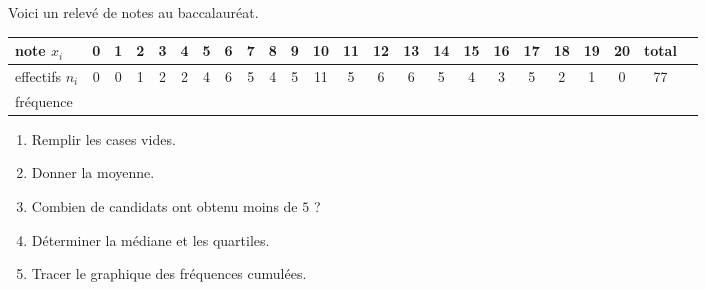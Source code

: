 
\begin{exercice}\label{exoSeconde-0014}

    Voici un relevé de notes au baccalauréat.
    \begin{center}
        \begin{tabular}{|l||c|c|c|c|c|c|c|c|c|c|c|c|c|c|c|c|c|c|c|c|c|c||c|}
            \hline
            note \( x_i\)&0&1&2&3&4&5&6&7&8&9&10&11&12&13&14&15&16&17&18&19&20&total\\
            \hline
            effectifs \( n_i\)&0&0&1&2&2&4&6&5&4&5&11&5&6&6&5&4&3&5&2&1&0&77\\
            \hline
            fréquence&&&&&&&&&&&&&&&&&&&&&&\\
            \hline
        \end{tabular}
    \end{center}
    \begin{enumerate}
        \item
            Remplir les cases vides.
        \item
            Donner la moyenne.
        \item
            Combien de candidats ont obtenu moins de \( 5\) ?
        \item
            Déterminer la médiane et les quartiles.
        \item
            Tracer le graphique des fréquences cumulées.
    \end{enumerate}

\end{exercice}
